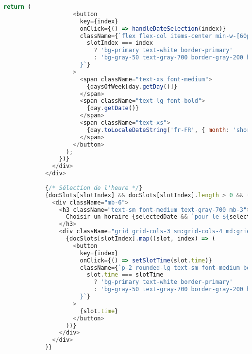 \begin{lstlisting}[language=JavaScript, caption=AppointmentForm.jsx - Formulaire de réservation avec validation]
                  return (
                    <button
                      key={index}
                      onClick={() => handleDateSelection(index)}
                      className={`flex flex-col items-center min-w-[60px] p-3 rounded-lg border transition-all ${
                        slotIndex === index 
                          ? 'bg-primary text-white border-primary' 
                          : 'bg-gray-50 text-gray-700 border-gray-200 hover:border-primary'
                      }`}
                    >
                      <span className="text-xs font-medium">
                        {daysOfWeek[day.getDay()]}
                      </span>
                      <span className="text-lg font-bold">
                        {day.getDate()}
                      </span>
                      <span className="text-xs">
                        {day.toLocaleDateString('fr-FR', { month: 'short' })}
                      </span>
                    </button>
                  );
                })}
              </div>
            </div>
            
            {/* Sélection de l'heure */}
            {docSlots[slotIndex] && docSlots[slotIndex].length > 0 && (
              <div className="mb-6">
                <h3 className="text-sm font-medium text-gray-700 mb-3">
                  Choisir un horaire {selectedDate && `pour le ${selectedDate}`}
                </h3>
                <div className="grid grid-cols-3 sm:grid-cols-4 md:grid-cols-6 gap-2">
                  {docSlots[slotIndex].map((slot, index) => (
                    <button
                      key={index}
                      onClick={() => setSlotTime(slot.time)}
                      className={`p-2 rounded-lg text-sm font-medium border transition-all ${
                        slot.time === slotTime
                          ? 'bg-primary text-white border-primary'
                          : 'bg-gray-50 text-gray-700 border-gray-200 hover:border-primary hover:bg-primary hover:text-white'
                      }`}
                    >
                      {slot.time}
                    </button>
                  ))}
                </div>
              </div>
            )}
            

\end{lstlisting}
